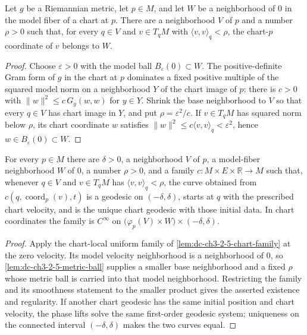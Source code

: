 \begin{lemma}
  \label{lem:dc-ch3-2-5-metric-ball}
  \leanok
  Let $g$ be a Riemannian metric, let $p\in M$, and let $W$ be a neighborhood of
  $0$ in the model fiber of a chart at $p$.  There are a neighborhood $V$ of $p$
  and a number $\rho>0$ such that, for every $q\in V$ and
  $v\in T_qM$ with $\langle v,v\rangle_q<\rho$, the chart-$p$ coordinate of $v$
  belongs to $W$.
\end{lemma}
\begin{proof}
  \leanok
  Choose $\varepsilon>0$ with the model ball $B_\varepsilon(0)\subset W$.
  The positive-definite Gram form of $g$ in the chart at $p$ dominates a fixed
  positive multiple of the squared model norm on a neighborhood $Y$ of the
  chart image of $p$: there is $c>0$ with
  $\lVert w\rVert^2\le c\,G_y(w,w)$ for $y\in Y$.  Shrink the base neighborhood
  to $V$ so that every $q\in V$ has chart image in $Y$, and put
  $\rho=\varepsilon^2/c$.  If $v\in T_qM$ has squared norm below $\rho$, its
  chart coordinate $w$ satisfies
  $\lVert w\rVert^2\le c\langle v,v\rangle_q<\varepsilon^2$, hence
  $w\in B_\varepsilon(0)\subset W$.
\end{proof}

\begin{lemma}
  \label{lem:dc-ch3-2-5-metric-family}
  \leanok
  For every $p\in M$ there are $\delta>0$, a neighborhood $V$ of $p$,
  a model-fiber neighborhood $W$ of $0$, a number $\rho>0$, and a family
  $c:M\times E\times\mathbb R\to M$ such that, whenever $q\in V$ and
  $v\in T_qM$ has $\langle v,v\rangle_q<\rho$, the curve obtained from
  $c(q,\operatorname{coord}_p(v),t)$ is a geodesic on $(-\delta,\delta)$,
  starts at $q$ with the prescribed chart velocity, and is the unique chart
  geodesic with those initial data.  In chart coordinates the family is
  $C^\infty$ on $\bigl(\varphi_p(V)\times W\bigr)\times(-\delta,\delta)$.
\end{lemma}
\begin{proof}
  \leanok
  Apply the chart-local uniform family of
  \cref{lem:dc-ch3-2-5-chart-family} at the zero velocity.  Its model velocity
  neighborhood is a neighborhood of $0$, so
  \cref{lem:dc-ch3-2-5-metric-ball} supplies a smaller base neighborhood and a
  fixed $\rho$ whose metric ball is carried into that model neighborhood.
  Restricting the family and its smoothness statement to the smaller product
  gives the asserted existence and regularity.  If another chart geodesic has
  the same initial position and chart velocity, the phase lifts solve the same
  first-order geodesic system; uniqueness on the connected interval
  $(-\delta,\delta)$ makes the two curves equal.
\end{proof}

